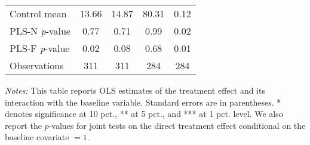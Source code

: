 \begin{table}[ht]
{\begin{threeparttable}
\begin{tabular}{l*{4}{c}}
Control mean    &    13.66         &    14.87         &    80.31         &     0.12         \\
PLS-N \emph{p}-value&     0.77         &     0.71         &     0.99         &     0.02         \\
PLS-F \emph{p}-value&     0.02         &     0.08         &     0.68         &     0.01         \\
Observations    &      311         &      311         &      284         &      284         \\
\bottomrule \end{tabular} \begin{tablenotes}[flushleft] \footnotesize \item \emph{Notes:} This table reports OLS estimates of the treatment effect and its interaction with the baseline variable. Standard errors are in parentheses. * denotes significance at 10 pct., ** at 5 pct., and *** at 1 pct. level. We also report the \(p\)-values for joint tests on the direct treatment effect conditional on the baseline covariate $= 1$. \end{tablenotes} \end{threeparttable} } \end{table}

